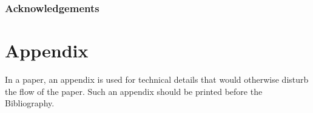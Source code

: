 




\section*{Acknowledgements}


\clearpage
\appendix
\part*{Appendix}

In a paper, an appendix is used for technical details that would otherwise disturb the flow of the paper.
Such an appendix should be printed before the Bibliography.

\printbibliography
% 
% 

% 



% 


